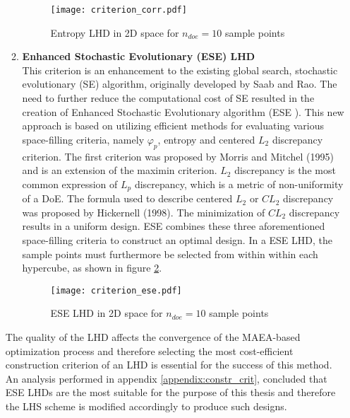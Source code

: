 \begin{enumerate}
\begin{enumerate}
\begin{figure}[h!]
    \centering
    \texttt{[image: criterion\_corr.pdf]}    
    \caption{Entropy LHD in 2D space for $n_{doe} = 10$ 
    sample points}
    \label{fig:maxent_LHD}
\end{figure}

\newpage


\item \textbf{Enhanced Stochastic Evolutionary (ESE) LHD} \\
This criterion is an enhancement to the existing global 
search, stochastic evolutionary (SE) algorithm, originally 
developed by Saab and Rao\cite{SE}. The need to further 
reduce the computational cost of SE resulted in the creation 
of Enhanced Stochastic Evolutionary algorithm (ESE
)\cite{ESE}. This new approach is based on utilizing 
efficient methods for evaluating various space-filling criteria, 
namely $φ_{p}$, entropy and centered $L_{2}$ discrepancy 
criterion. The first criterion was proposed by Morris and Mitchel 
(1995)\cite{fp criterion} and is an extension of the maximin 
criterion. $L_{2}$ discrepancy is the most common expression of 
$L_{p}$ discrepancy, which is a metric of non-uniformity of a DoE. 
The formula used to describe centered $L_{2}$ or $CL_{2}$ 
discrepancy was proposed by Hickernell (1998)\cite{discrepancy}. 
The minimization of $CL_{2}$ discrepancy results in a uniform 
design. ESE combines these three aforementioned space-filling
criteria to construct an optimal design. In a ESE LHD, the sample 
points must furthermore be selected from within within each 
hypercube, as shown in figure \ref{fig:ESE_LHD}.

\begin{figure}[h!]
    \centering
    \texttt{[image: criterion\_ese.pdf]}    
    \caption{ESE LHD in 2D space for $n_{doe} = 10$ 
    sample points}
    \label{fig:ESE_LHD}
\end{figure}

\end{enumerate}

The quality of the LHD affects the convergence of the 
MAEA-based optimization process and therefore selecting the 
most cost-efficient construction criterion of an LHD is essential 
for the success of this method. An analysis performed in appendix 
\ref{appendix:constr_crit}, concluded that ESE LHDs are the most 
suitable for the purpose of this thesis and therefore the LHS 
scheme is modified accordingly to produce such designs.


\end{enumerate}
